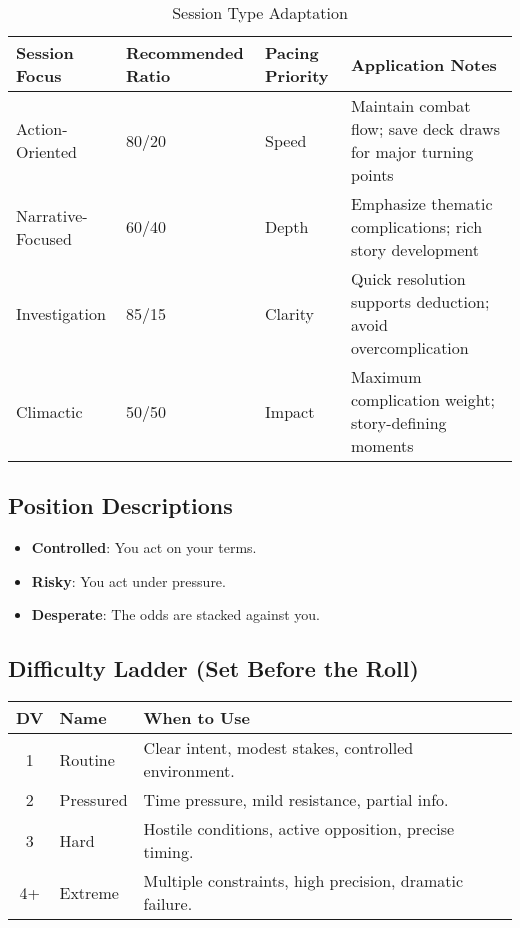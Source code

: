 \begin{table}[htbp]
\centering
\caption{Session Type Adaptation}
\begin{tabular}{|p{3cm}|p{3cm}|p{3cm}|p{4cm}|}
\hline
\textbf{Session Focus} & \textbf{Recommended Ratio} & \textbf{Pacing Priority} & \textbf{Application Notes} \\
\hline
Action-Oriented & 80/20 & Speed & Maintain combat flow; save deck draws for major turning points \\
\hline
Narrative-Focused & 60/40 & Depth & Emphasize thematic complications; rich story development \\
\hline
Investigation & 85/15 & Clarity & Quick resolution supports deduction; avoid overcomplication \\
\hline
Climactic & 50/50 & Impact & Maximum complication weight; story-defining moments \\
\hline
\end{tabular}
\end{table}

\subsection*{Position Descriptions}

\begin{itemize}
    \item \textbf{Controlled}: You act on your terms.
    \item \textbf{Risky}: You act under pressure.
    \item \textbf{Desperate}: The odds are stacked against you.
\end{itemize}

\subsection*{Difficulty Ladder (Set Before the Roll)}

\begin{center}
\begin{tabular}{cll}
\toprule
\textbf{DV} & \textbf{Name} & \textbf{When to Use} \\
\midrule
1 & Routine\index{Difficulty Value!Routine} & Clear intent, modest stakes, controlled environment. \\
2 & Pressured\index{Difficulty Value!Pressured} & Time pressure, mild resistance, partial info. \\
3 & Hard\index{Difficulty Value!Hard} & Hostile conditions, active opposition, precise timing. \\
4+ & Extreme\index{Difficulty Value!Extreme} & Multiple constraints, high precision, dramatic failure. \\
\bottomrule
\end{tabular}
\end{center}

